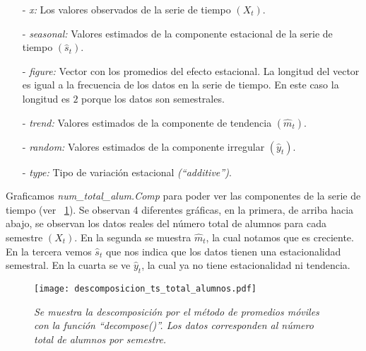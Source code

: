 \begin{itemize}
\item[-] \textit{x:} Los valores observados de la serie de tiempo $(X_{t})$.

\item[-] \textit{seasonal:} Valores estimados de la componente estacional de la serie de tiempo $(\hat{s}_{t})$.

\item[-] \textit{figure:} Vector con los promedios del efecto estacional. La longitud del vector es igual a la frecuencia de los datos en la serie de tiempo. En este caso la longitud es $2$ porque los datos son semestrales.

\item[-] \textit{trend:} Valores estimados de la componente de tendencia $(\hat{m}_{t})$.

\item[-] \textit{random:} Valores estimados de la componente irregular $(\hat{y}_{t})$.

\item[-] \textit{type:} Tipo de variación estacional \textit{(``additive'')}.
\end{itemize}


Graficamos \textit{num\_total\_alum.Comp} para poder ver las componentes de la serie de tiempo (ver \figurename{~\ref{img_en_ing_2}}). Se observan 4 diferentes gráficas, en la primera, de arriba hacia abajo, se observan los datos reales del número total de alumnos para cada semestre $(X_{t})$. En la segunda se muestra $\hat{m}_{t}$, la cual notamos que es creciente. En la tercera vemos $\hat{s}_{t}$ que nos indica que los datos tienen una estacionalidad semestral. En la cuarta se ve $\hat{y}_{t}$, la cual ya no tiene estacionalidad ni tendencia.

\begin{figure}[H]
\centering
\texttt{[image: descomposicion\_ts\_total\_alumnos.pdf]} %
\caption[\textit{Descomposición por el método de promedios móviles}]{\textit{Se muestra la descomposición por el método de promedios móviles con la función ``decompose()''. Los datos corresponden al número total de alumnos por semestre.}}\label{img_en_ing_2}
\end{figure}

